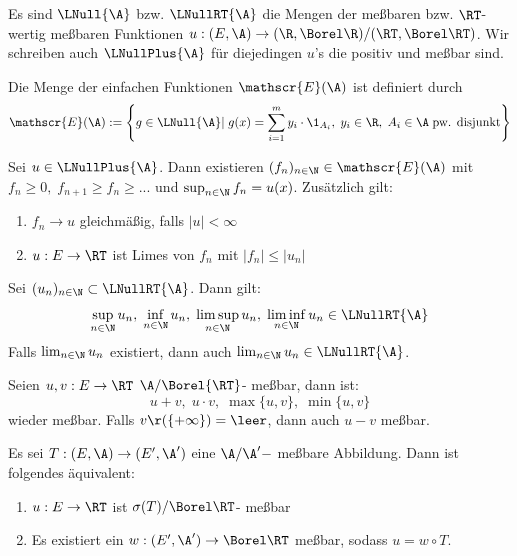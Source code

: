 \documentclass[11pt, a4paper]{article}
\begin{document}
\begin{definition}
    Es sind $\LNull{\A}$ bzw. $\LNullRT{\A}$ die Mengen der meßbaren bzw. $\RT$-wertig meßbaren Funktionen $u:(E,\A)\to (\R, \Borel \R) / (\RT, \Borel \RT)$. Wir schreiben auch $\LNullPlus{\A}$ für diejedingen $u$'s die positiv und meßbar sind.
\end{definition}

\begin{definition} Die Menge der einfachen Funktionen $\mathscr{E}(\A)$ ist definiert durch
$$\mathscr{E}(\A) := \left\{g\in \LNull{\A} | \; g(x) = \sum_{i=1}^m y_i \cdot \1 _{A_i}, \; y_i\in \R, \; A_i \in \A \; \text{pw. disjunkt}\right\}$$
\end{definition}


\begin{lemma} Sei $u\in \LNullPlus{\A}$. Dann existieren $(f_n)_{n\in\N}\in \mathscr{E}(\A)$ mit $f_n\geq 0, \; f_{n+1} \geq f_n\geq ...$ und $\sup_{n\in\N} f_n = u(x)$. Zusätzlich gilt:
\begin{enumerate}
    \item $f_n \to u$ gleichmäßig, falls $|u| < \infty $
    \item $u:E\to \RT$ ist Limes von $f_n$ mit $|f_n|\leq |u_n|$
\end{enumerate}
\end{lemma}



\begin{corollary}
    Sei $(u_n)_{n\in \N}\subset \LNullRT{\A}$. Dann gilt:
    $$\sup_{n\in \N}{u_n},\; \inf_{n\in \N}{u_n},\; \limsup_{n\in \N}{u_n},\; \liminf_{n\in \N}{u_n}\in \LNullRT{\A}$$
    Falls $\lim_{n\in \N}{u_n}$ existiert, dann auch $\lim_{n\in \N}{u_n} \in \LNullRT{\A}$.
\end{corollary}

\begin{corollary}
Seien $u,v: E\to \RT$ $\A/ \Borel{\RT}$- meßbar, dann ist:
$$u+v,\; u\cdot v, \; \max\{u,v\},\; \min\{u,v\}$$
wieder meßbar. Falls $v\r(\{+\infty\})=\leer$, dann auch $u-v$ meßbar.
\end{corollary}

\begin{lemma}
Es sei $T:(E,\A) \to (E',\A')$ eine $\A/\A'-$ meßbare Abbildung. Dann ist folgendes äquivalent:

\begin{enumerate}[label = \roman*.]
    \item $u: E\to \RT$ ist $\sigma(T)/\Borel \RT $- meßbar
    \item Es existiert ein $w: (E',\A')\to \Borel \RT$ meßbar, sodass $u=w\circ T$.
\end{enumerate}
\end{lemma}
\end{document}
